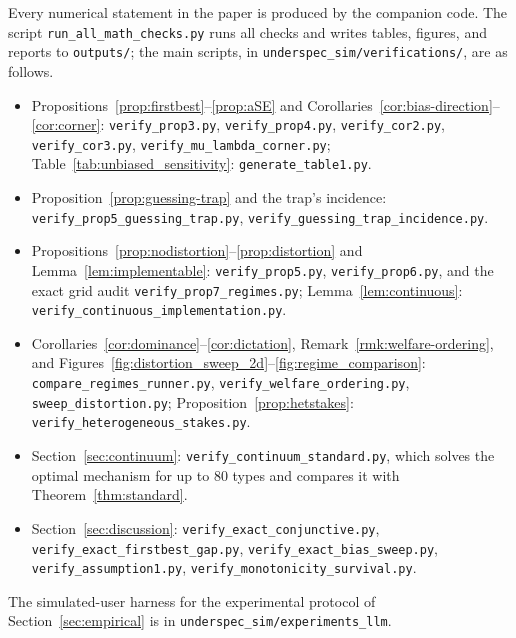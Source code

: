 \documentclass[11pt]{article}
\begin{document}
\begin{flushleft}
Every numerical statement in the paper is produced by the companion code. The script \texttt{run\_all\_math\_checks.py} runs all checks and writes tables, figures, and reports to \texttt{outputs/}; the main scripts, in \texttt{underspec\_sim/verifications/}, are as follows.
\begin{itemize}[leftmargin=*,itemsep=1pt]
\item Propositions~\ref{prop:firstbest}--\ref{prop:aSE} and Corollaries~\ref{cor:bias-direction}--\ref{cor:corner}: \texttt{verify\_prop3.py}, \texttt{verify\_prop4.py}, \texttt{verify\_cor2.py}, \texttt{verify\_cor3.py}, \texttt{verify\_mu\_lambda\_corner.py}; Table~\ref{tab:unbiased_sensitivity}: \texttt{generate\_table1.py}.
\item Proposition~\ref{prop:guessing-trap} and the trap's incidence: \texttt{verify\_prop5\_guessing\_trap.py}, \texttt{verify\_guessing\_trap\_incidence.py}.
\item Propositions~\ref{prop:nodistortion}--\ref{prop:distortion} and Lemma~\ref{lem:implementable}: \texttt{verify\_prop5.py}, \texttt{verify\_prop6.py}, and the exact grid audit \texttt{verify\_prop7\_regimes.py}; Lemma~\ref{lem:continuous}: \texttt{verify\_continuous\_implementation.py}.
\item Corollaries~\ref{cor:dominance}--\ref{cor:dictation}, Remark~\ref{rmk:welfare-ordering}, and Figures~\ref{fig:distortion_sweep_2d}--\ref{fig:regime_comparison}: \texttt{compare\_regimes\_runner.py}, \texttt{verify\_welfare\_ordering.py}, \texttt{sweep\_distortion.py}; Proposition~\ref{prop:hetstakes}: \texttt{verify\_heterogeneous\_stakes.py}.
\item Section~\ref{sec:continuum}: \texttt{verify\_continuum\_standard.py}, which solves the optimal mechanism for up to 80 types and compares it with Theorem~\ref{thm:standard}.
\item Section~\ref{sec:discussion}: \texttt{verify\_exact\_conjunctive.py}, \texttt{verify\_exact\_firstbest\_gap.py}, \texttt{verify\_exact\_bias\_sweep.py}, \texttt{verify\_assumption1.py}, \texttt{verify\_monotonicity\_survival.py}.
\end{itemize}
The simulated-user harness for the experimental protocol of Section~\ref{sec:empirical} is in \texttt{underspec\_sim/experiments\_llm}.
\end{flushleft}
\end{document}
